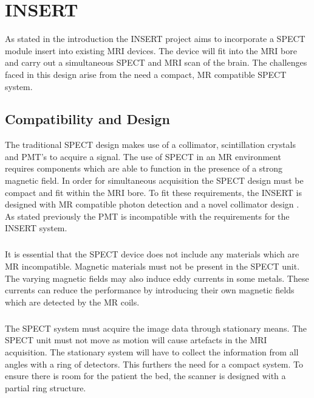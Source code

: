 \chapter{INSERT}
\label{chapterlabel2}
As stated in the introduction the INSERT project aims to incorporate a SPECT module insert into existing MRI devices. The device will fit into the MRI bore and carry out a simultaneous SPECT and MRI scan of the brain. The challenges faced in this design arise from the need a compact, MR compatible SPECT system.
\section{Compatibility and Design}
The traditional SPECT design makes use of a collimator, scintillation crystals and PMT's to acquire a signal. The use of SPECT in an MR environment requires components which are able to function in the presence of a strong magnetic field. In order for simultaneous acquisition the SPECT design must be compact and fit within the MRI bore. To fit these requirements, the INSERT is designed with MR compatible photon detection \cite{7287793} and a novel collimator design \cite{7181734}. As stated previously the PMT is incompatible with the requirements for the INSERT system. 
\paragraph{}
It is essential that the SPECT device does not include any materials which are MR incompatible. Magnetic materials must not be present in the SPECT unit. The varying magnetic fields may also induce eddy currents in some metals. These currents can reduce the performance by introducing their own magnetic fields which are detected by the MR coils. 
\paragraph{}
The SPECT system must acquire the image data through stationary means. The SPECT unit must not move as motion will cause artefacts in the MRI acquisition. The stationary system will have to collect the information from all angles with a ring of detectors. This furthers the need for a compact system. To ensure there is room for the patient the bed, the scanner is designed with a partial ring structure.
